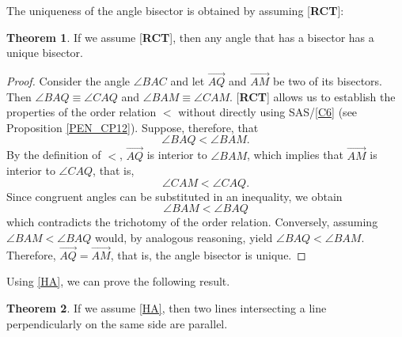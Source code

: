 \documentclass[11pt,a4paper]{article}
\theoremstyle{definition}
\newtheorem{thm}{Theorem}[section]
\theoremstyle{remark}
\numberwithin{equation}{section}
\begin{document}
The uniqueness of the angle bisector is obtained by assuming [\textbf{RCT}]:
\begin{thm}\label{PEN_RCT_AB}
If we assume [\textbf{RCT}], then any angle that has a bisector has a unique bisector.
\end{thm}
\begin{proof}
Consider the angle $\angle BAC$ and let $\overrightarrow{AQ}$ and $\overrightarrow{AM}$ be two of its bisectors. Then $\angle BAQ\equiv\angle CAQ$ and $\angle BAM\equiv\angle CAM$. [\textbf{RCT}] allows us to establish the properties of the order relation $<$ without directly using SAS/\ref{C6} (see Proposition \ref{PEN_CP12}). Suppose, therefore, that
\begin{equation*}
  \angle BAQ<\angle BAM.
\end{equation*}
By the definition of $<$, $\overrightarrow{AQ}$ is interior to $\angle BAM$, which implies that $\overrightarrow{AM}$ is interior to $\angle CAQ$, that is,
\begin{equation*}
  \angle CAM<\angle CAQ.
\end{equation*}
Since congruent angles can be substituted in an inequality, we obtain
\begin{equation*}
  \angle BAM<\angle BAQ
\end{equation*}
which contradicts the trichotomy of the order relation. Conversely, assuming $\angle BAM<\angle BAQ$ would, by analogous reasoning, yield $\angle BAQ<\angle BAM$. Therefore, $\overrightarrow{AQ}=\overrightarrow{AM}$, that is, the angle bisector is unique.
\end{proof}
Using \ref{HA}, we can prove the following result.
\begin{thm}\label{PEN_HA}
If we assume \ref{HA}, then two lines intersecting a line perpendicularly on the same side are parallel.
\end{thm}
\end{document}
